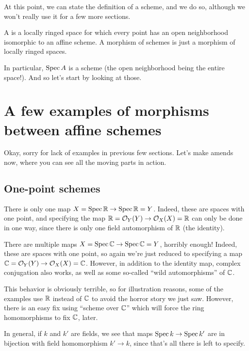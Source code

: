 At this point, we can state the definition of a scheme,
and we do so, although we won't really use it for a few more sections.
\begin{definition}
	A  is a locally ringed space
	for which every point has an open neighborhood
	isomorphic to an affine scheme.
	A morphism of schemes is just a morphism of locally ringed spaces.
\end{definition}
In particular, $\operatorname{Spec} A$ is a scheme
(the open neighborhood being the entire space!).
And so let's start by looking at those.

\section{A few examples of morphisms between affine schemes}
Okay, sorry for lack of examples in previous few sections.
Let's make amends now,
where you can see all the moving parts in action.

\subsection{One-point schemes}
\begin{example}
	There is only one map $X = \operatorname{Spec} \mathbb R \to \operatorname{Spec} \mathbb R = Y$.
	Indeed, these are spaces with one point,
	and specifying the map $\mathbb R = \mathcal O_Y(Y) \to \mathcal O_X(X) = \mathbb R$
	can only be done in one way,
	since there is only one field automorphism of $\mathbb R$ (the identity).
\end{example}
\begin{example}
	\label{ex:spec_C_morphism}
	There are multiple maps $X = \operatorname{Spec} \mathbb C \to \operatorname{Spec} \mathbb C = Y$,
	horribly enough!
	Indeed, these are spaces with one point,
	so again we're just reduced to specifying
	a map $\mathbb C = \mathcal O_Y(Y) \to \mathcal O_X(X) = \mathbb C$.
	However, in addition to the identity map,
	complex conjugation also works,
	as well as some so-called ``wild automorphisms'' of $\mathbb C$.
\end{example}

This behavior is obviously terrible,
so for illustration reasons,
some of the examples use $\mathbb R$ instead of $\mathbb C$
to avoid the horror story we just saw.
However, there is an easy fix using ``scheme over $\mathbb C$''
which will force the ring homomorphisms to fix $\mathbb C$, later.

\begin{example}
	In general, if $k$ and $k'$ are fields,
	we see that maps $\operatorname{Spec} k \to \operatorname{Spec} k'$
	are in bijection with field homomorphism $k' \to k$,
	since that's all there is left to specify.
\end{example}

